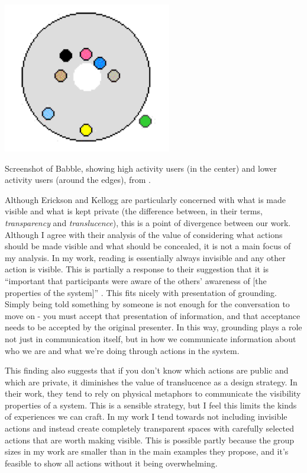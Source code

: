 \begin{marginfigure}
	\includegraphics{figures/babble.png}
	\caption{Screenshot of Babble, showing high activity users (in the center) and lower activity users (around the edges), from \citep{Erickson:2003td}.}
	\label{fig:proxy-babble}
\end{marginfigure}

Although Erickson and Kellogg are particularly concerned with what is made visible and what is kept private (the difference between, in their terms, \emph{transparency} and \emph{translucence}), this is a point of divergence between our work. Although I agree with their analysis of the value of considering what actions should be made visible and what should be concealed, it is not a main focus of my analysis. In my work, reading is essentially always invisible and any other action is visible. This is partially a response to their suggestion that it is ``important that participants were aware of the others' awareness of [the properties of the system]'' \citep{Erickson:2003td}. This fits nicely with  presentation of grounding. Simply being told something by someone is not enough for the conversation to move on - you must accept that presentation of information, and that acceptance needs to be accepted by the original presenter. In this way, grounding plays a role not just in communication itself, but in how we communicate information about who we are and what we're doing through actions in the system. 

This finding also suggests that if you don't know which actions are public and which are private, it diminishes the value of translucence as a design strategy. In their work, they tend to rely on physical metaphors to communicate the visibility properties of a system. This is a sensible strategy, but I feel this limits the kinds of experiences we can craft. In my work I tend towards not including invisible actions and instead create completely transparent spaces with carefully selected actions that are worth making visible. This is possible partly because the group sizes in my work are smaller than in the main examples they propose, and it's feasible to show all actions without it being overwhelming. 

